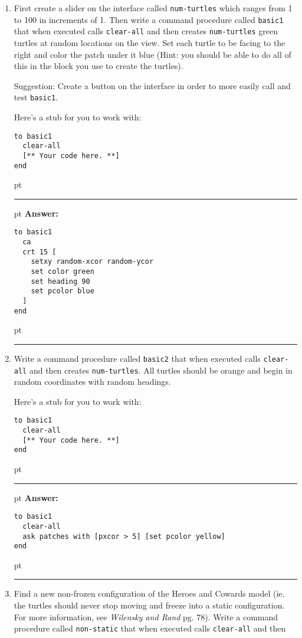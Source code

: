 \documentclass[11pt,oneside]{book}
\begin{document}
\begin{enumerate}
\item First create a slider on the interface called \texttt{num-turtles} which ranges from 1 to 100 in increments of 1. Then write a command procedure called \texttt{basic1} that when executed calls \texttt{clear-all} and then creates \texttt{num-turtles} green turtles at random locations on the view. Set each turtle to be facing to the right and color the patch under it blue (Hint: you should be able to do all of this in the block you use to create the turtles).

Suggestion: Create a button on the interface in order to more easily call and test \texttt{basic1}.

Here's a stub for you to work with:
\begin{verbatim}
to basic1
  clear-all
  [** Your code here. **]
end
\end{verbatim}

\ifnum{}
 pt
\hrule
{} pt
{\bf Answer: }
\begin{verbatim}
to basic1
  ca
  crt 15 [
    setxy random-xcor random-ycor
    set color green
    set heading 90
    set pcolor blue
  ]
end
\end{verbatim}
 pt
\hrule
\fi

\item Write a command procedure called \texttt{basic2} that when executed calls \texttt{clear-all} and then creates \texttt{num-turtles}. All turtles should be orange and begin in random coordinates with random headings. 

Here's a stub for you to work with:
\begin{verbatim}
to basic1
  clear-all
  [** Your code here. **]
end
\end{verbatim}

\ifnum{}
 pt
\hrule
{} pt
{\bf Answer: }
\begin{verbatim}
to basic1
  clear-all
  ask patches with [pxcor > 5] [set pcolor yellow]
end
\end{verbatim}
 pt
\hrule
\fi

\item Find a new non-frozen configuration of the Heroes and Cowards model (ie. the turtles should never stop moving and freeze into a static configuration. For more information, see \textit{Wilensky and Rand} pg. 78). Write a command procedure called \texttt{non-static} that when executed calls \texttt{clear-all} and then 


\end{enumerate}
\end{document}
